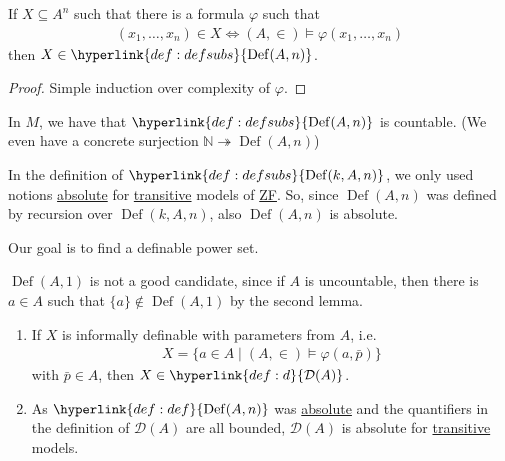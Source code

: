 \documentclass{article}
\newcommand{\named}[1]{\textbf{#1}\index{#1}}
\newcommand{\1}{\mathbbm{1}}
\DeclareMathOperator{\Def}{Def}
\let\models\vDash
\begin{document}
\begin{lemma}
  If $X \subseteq A^n$ such that there is a formula $\varphi$ such that
  \begin{align*}
    (x_1, \dotsc, x_n) \in X \iff (A,\in) \models \varphi(x_1, \dotsc, x_n)
  \end{align*}
  then $X \in \hyperlink{def:defsubs}{\Def(A,n)}$.
\end{lemma}
\begin{proof}
  Simple induction over complexity of $\varphi$.
\end{proof}
\begin{lemma}
  In $M$, we have that $\hyperlink{def:defsubs}{\Def(A,n)}$ is countable. (We even have a concrete surjection $\mathbb{N} \twoheadrightarrow \Def(A,n)$)
\end{lemma}
\begin{remark}
  In the definition of $\hyperlink{def:defsubs}{\Def(k,A,n)}$, we only used notions \hyperlink{def:abso}{absolute} for \hyperlink{def:transitive}{transitive} models of \hyperlink{def:axioms}{\textsf{ZF}}.
  So, since $\Def(A,n)$ was defined by recursion over $\Def(k,A,n)$, also $\Def(A,n)$ is absolute.
\end{remark}
\begin{aim}
  Our goal is to find a definable power set.
\end{aim}
\hyperlink{def:defsubs}{$\Def(A,1)$} is not a good candidate, since if $A$ is uncountable, then there is $a \in A$ such that $\{a\} \notin \Def(A,1)$ by the second lemma.
\begin{remark}\leavevmode
  \begin{enumerate}
    \item If $X$ is informally definable with parameters from $A$, i.e.\
      \begin{align*}
        X = \{a \in A \mid (A,\in) \models \varphi(a,\bar{p})\}
      \end{align*}
        with $\bar{p} \in A$, then $X \in \hyperlink{def:d}{\mathcal{D}(A)}$.
    \item As $\hyperlink{def:def}{\Def(A,n)}$ was \hyperlink{def:abso}{absolute} and the quantifiers in the definition of $\mathcal{D}(A)$ are all bounded, $\mathcal{D}(A)$ is absolute for \hyperlink{def:transitive}{transitive} models.
  \end{enumerate}
\end{remark}
\end{document}
